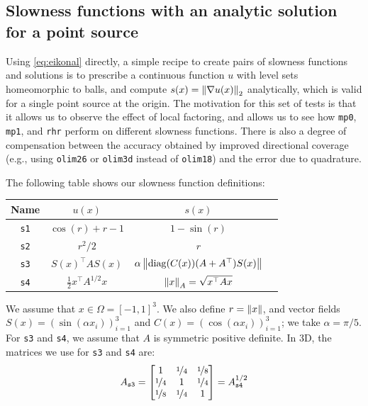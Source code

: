 \documentclass[sisc-eikonal.tex]{subfiles}
\begin{document}
\subsection[Single point source]{Slowness functions with an analytic
  solution for a point source}\label{ssec:point-source-problems}

Using \cref{eq:eikonal} directly, a simple recipe to create pairs of
slowness functions and solutions is to prescribe a continuous function
$u$ with level sets homeomorphic to balls, and compute
$s(x) = \left\|\nabla u(x)\right\|_2$ analytically, which is valid for a
single point source at the origin. The motivation for this set of
tests is that it allows us to observe the effect of local factoring,
and allows us to see how \texttt{mp0}, \texttt{mp1}, and \texttt{rhr}
perform on different slowness functions. There is also a degree of
compensation between the accuracy obtained by improved directional
coverage (e.g., using \texttt{olim26} or \texttt{olim3d} instead of
\texttt{olim18}) and the error due to quadrature.

The following table shows our slowness function definitions:
\vspace{0.5em}
\begin{center}
  \begin{tabular}{cccc}
    Name & $u(x)$ & $s(x)$ \\
    \midrule
    \texttt{s1} & $\cos(r) + r - 1$ & $1 - \sin(r)$ \\
    \texttt{s2} & $r^2/2$ & $r$ \\
    \texttt{s3} & $S(x)^\top A S(x)$ & $\alpha\left\|\operatorname{diag}(C(x)){(A + A^\top)}S(x)\right\|$ \\
    \texttt{s4} & $\tfrac{1}{2} x^\top A^{1/2} x$ & $\left\|x\right\|_A = \sqrt{x^\top A x}$
  \end{tabular}
\end{center}
\vspace{0.5em} We assume that $x \in \Omega = [-1, 1]^3$. We also
define $r = \left\|x\right\|$, and vector fields
$S(x) = (\sin(\alpha x_i))_{i=1}^3$ and
$C(x) = (\cos(\alpha x_i))_{i=1}^3$; we take $\alpha = \pi/5$. For
\texttt{s3} and \texttt{s4}, we assume that $A$ is symmetric positive
definite. In 3D, the matrices we use for \texttt{s3} and \texttt{s4}
are:\begin{equation} A_{\texttt{s3}} = \begin{bmatrix}
    1 & \nicefrac{1}{4} & \nicefrac{1}{8} \\
    \nicefrac{1}{4} & 1 & \nicefrac{1}{4} \\
    \nicefrac{1}{8} & \nicefrac{1}{4} & 1
  \end{bmatrix} = A_{\texttt{s4}}^{1/2}
\end{equation}
\end{document}
